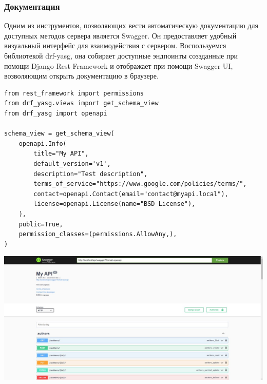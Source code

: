\documentclass[a4paper,14pt]{extarticle}
\begin{document}
\subsubsection{Документация}
Одним из инструментов, позволяющих вести автоматическую документацию для доступных
методов сервера является Swagger. Он предоставляет удобный визуальный интерфейс
для взаимодействия с сервером. 
Воспользуемся библиотекой drf-yasg, она собирает доступные эндпоинты соззданные при 
помощи Django Rest Framework и отображает при помощи Swagger UI, возволяющим открыть
документацию в браузере.
\begin{verbatim}
from rest_framework import permissions
from drf_yasg.views import get_schema_view
from drf_yasg import openapi

schema_view = get_schema_view(
    openapi.Info(
        title="My API",
        default_version='v1',
        description="Test description",
        terms_of_service="https://www.google.com/policies/terms/",
        contact=openapi.Contact(email="contact@myapi.local"),
        license=openapi.License(name="BSD License"),
    ),
    public=True,
    permission_classes=(permissions.AllowAny,),
)
\end{verbatim}
\includegraphics[width=140mm]{swagger.jpg}
\end{document}
